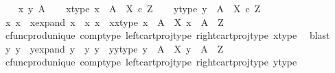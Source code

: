 \begin{isabellebody}
\ \ \isamarkupfalse%
\ x\ y\ A\isanewline
\ \ \isamarkupfalse%
\ x{\isacharunderscore}{\kern0pt}type{\isacharcolon}{\kern0pt}\ {\isachardoublequoteopen}x\ {\isacharcolon}{\kern0pt}\ A\ {\isasymrightarrow}\ X\ {\isasymtimes}\isactrlsub c\ Z{\isachardoublequoteclose}\isanewline
\ \ \isamarkupfalse%
\ y{\isacharunderscore}{\kern0pt}type{\isacharcolon}{\kern0pt}\ {\isachardoublequoteopen}y\ {\isacharcolon}{\kern0pt}\ A\ {\isasymrightarrow}\ X\ {\isasymtimes}\isactrlsub c\ Z{\isachardoublequoteclose}\isanewline
\isanewline
\ \ \isamarkupfalse%
\ x{}\ x{}\ \ x{\isacharunderscore}{\kern0pt}expand{\isacharcolon}{\kern0pt}\ {\isachardoublequoteopen}x\ {\isacharequal}{\kern0pt}\ {\isasymlangle}x{}{\isacharcomma}{\kern0pt}\ x{}{\isasymrangle}{\isachardoublequoteclose}\ \ x{}{\isacharunderscore}{\kern0pt}x{}{\isacharunderscore}{\kern0pt}type{\isacharcolon}{\kern0pt}\ {\isachardoublequoteopen}x{}\ {\isacharcolon}{\kern0pt}\ A\ {\isasymrightarrow}\ X{\isachardoublequoteclose}\ {\isachardoublequoteopen}x{}\ {\isacharcolon}{\kern0pt}\ A\ {\isasymrightarrow}\ Z{\isachardoublequoteclose}\isanewline
\ \ \ \ \isamarkupfalse%
\ cfunc{\isacharunderscore}{\kern0pt}prod{\isacharunderscore}{\kern0pt}unique\ comp{\isacharunderscore}{\kern0pt}type\ left{\isacharunderscore}{\kern0pt}cart{\isacharunderscore}{\kern0pt}proj{\isacharunderscore}{\kern0pt}type\ right{\isacharunderscore}{\kern0pt}cart{\isacharunderscore}{\kern0pt}proj{\isacharunderscore}{\kern0pt}type\ x{\isacharunderscore}{\kern0pt}type\ \isamarkupfalse%
\ blast\isanewline
\ \ \isamarkupfalse%
\ y{}\ y{}\ \ y{\isacharunderscore}{\kern0pt}expand{\isacharcolon}{\kern0pt}\ {\isachardoublequoteopen}y\ {\isacharequal}{\kern0pt}\ {\isasymlangle}y{}{\isacharcomma}{\kern0pt}\ y{}{\isasymrangle}{\isachardoublequoteclose}\ \ y{}{\isacharunderscore}{\kern0pt}y{}{\isacharunderscore}{\kern0pt}type{\isacharcolon}{\kern0pt}\ {\isachardoublequoteopen}y{}\ {\isacharcolon}{\kern0pt}\ A\ {\isasymrightarrow}\ X{\isachardoublequoteclose}\ {\isachardoublequoteopen}y{}\ {\isacharcolon}{\kern0pt}\ A\ {\isasymrightarrow}\ Z{\isachardoublequoteclose}\isanewline
\ \ \ \ \isamarkupfalse%
\ cfunc{\isacharunderscore}{\kern0pt}prod{\isacharunderscore}{\kern0pt}unique\ comp{\isacharunderscore}{\kern0pt}type\ left{\isacharunderscore}{\kern0pt}cart{\isacharunderscore}{\kern0pt}proj{\isacharunderscore}{\kern0pt}type\ right{\isacharunderscore}{\kern0pt}cart{\isacharunderscore}{\kern0pt}proj{\isacharunderscore}{\kern0pt}type\ y{\isacharunderscore}{\kern0pt}type\ \isamarkupfalse%

\end{isabellebody}
